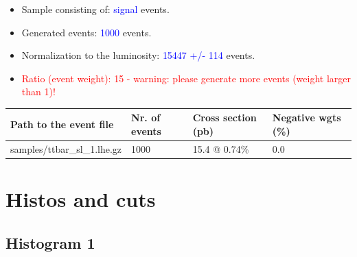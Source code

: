 \documentclass[a4paper, 10pt]{article}
\begin{document}
\begin{itemize}
  \item Sample consisting of: \textcolor{blue}{signal}  events.
   \item Generated events: \textcolor{blue}{1000 }  events.
   \item Normalization to the luminosity: \textcolor{blue}{15447}\textcolor{blue}{ +/\-- }\textcolor{blue}{114 }  events.
   \item\textcolor{red}{Ratio (event weight): }\textcolor{red}{15 }\textcolor{red}{ - warning: please generate more events (weight larger than 1)!}
\textcolor{red}{}
\end{itemize}
\begin{table}[H]
  \begin{center}
    \begin{tabular}{|m{55.0mm}|m{25.0mm}|m{30.0mm}|m{30.0mm}|}
      \hline
      {\cellcolor{yellow}         Path to the event file}& {\cellcolor{yellow}         Nr. of events}& {\cellcolor{yellow}         Cross section (pb)}& {\cellcolor{yellow}         Negative wgts (\%)}\\
      \hline
      {\cellcolor{white}          samples/\-ttbar\_sl\_1.lhe.gz}& {\cellcolor{white}          1000}& {\cellcolor{white}          15.4 @ 0.74\%}& {\cellcolor{white}          0.0}\\
\hline
    \end{tabular}
  \end{center}
\end{table}

\newpage
\section{ Histos and cuts}

\subsection{ Histogram 1}
\end{document}

